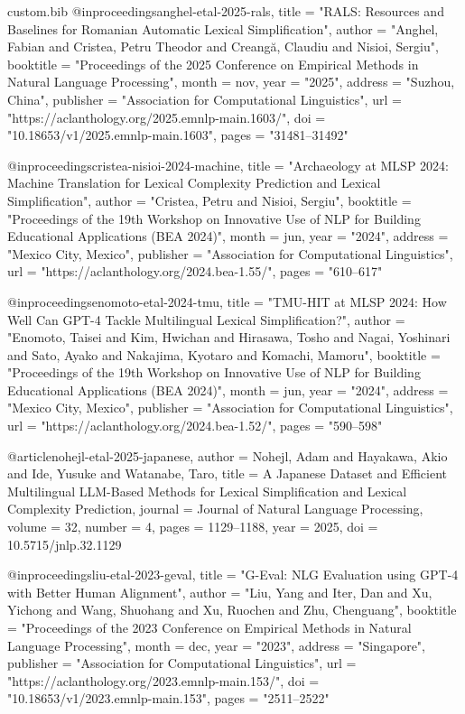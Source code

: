 \begin{filecontents*}[overwrite]{custom.bib}
@inproceedings{anghel-etal-2025-rals,
    title = "{RALS}: Resources and Baselines for {R}omanian Automatic Lexical Simplification",
    author = "Anghel, Fabian  and
      Cristea, Petru Theodor  and
      Creang{\u{a}}, Claudiu  and
      Nisioi, Sergiu",
    booktitle = "Proceedings of the 2025 Conference on Empirical Methods in Natural Language Processing",
    month = nov,
    year = "2025",
    address = "Suzhou, China",
    publisher = "Association for Computational Linguistics",
    url = "https://aclanthology.org/2025.emnlp-main.1603/",
    doi = "10.18653/v1/2025.emnlp-main.1603",
    pages = "31481--31492"
}

@inproceedings{cristea-nisioi-2024-machine,
    title = "Archaeology at {MLSP} 2024: Machine Translation for Lexical Complexity Prediction and Lexical Simplification",
    author = "Cristea, Petru  and
      Nisioi, Sergiu",
    booktitle = "Proceedings of the 19th Workshop on Innovative Use of NLP for Building Educational Applications (BEA 2024)",
    month = jun,
    year = "2024",
    address = "Mexico City, Mexico",
    publisher = "Association for Computational Linguistics",
    url = "https://aclanthology.org/2024.bea-1.55/",
    pages = "610--617"
}

@inproceedings{enomoto-etal-2024-tmu,
    title = "{TMU}-{HIT} at {MLSP} 2024: How Well Can {GPT}-4 Tackle Multilingual Lexical Simplification?",
    author = "Enomoto, Taisei  and
      Kim, Hwichan  and
      Hirasawa, Tosho  and
      Nagai, Yoshinari  and
      Sato, Ayako  and
      Nakajima, Kyotaro  and
      Komachi, Mamoru",
    booktitle = "Proceedings of the 19th Workshop on Innovative Use of NLP for Building Educational Applications (BEA 2024)",
    month = jun,
    year = "2024",
    address = "Mexico City, Mexico",
    publisher = "Association for Computational Linguistics",
    url = "https://aclanthology.org/2024.bea-1.52/",
    pages = "590--598"
}

@article{nohejl-etal-2025-japanese,
    author  = {Nohejl, Adam and Hayakawa, Akio and Ide, Yusuke and Watanabe, Taro},
    title   = {A {J}apanese Dataset and Efficient Multilingual {LLM}-Based Methods for Lexical Simplification and Lexical Complexity Prediction},
    journal = {Journal of Natural Language Processing},
    volume  = {32},
    number  = {4},
    pages   = {1129--1188},
    year    = {2025},
    doi     = {10.5715/jnlp.32.1129}
}

@inproceedings{liu-etal-2023-geval,
    title     = "{G}-{E}val: {NLG} Evaluation using {GPT}-4 with Better Human Alignment",
    author    = "Liu, Yang  and
      Iter, Dan  and
      Xu, Yichong  and
      Wang, Shuohang  and
      Xu, Ruochen  and
      Zhu, Chenguang",
    booktitle = "Proceedings of the 2023 Conference on Empirical Methods in Natural Language Processing",
    month     = dec,
    year      = "2023",
    address   = "Singapore",
    publisher = "Association for Computational Linguistics",
    url       = "https://aclanthology.org/2023.emnlp-main.153/",
    doi       = "10.18653/v1/2023.emnlp-main.153",
    pages     = "2511--2522"
}


\end{filecontents*}
